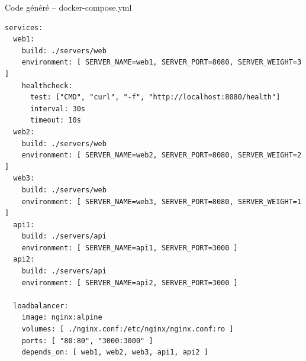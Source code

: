 \documentclass[aspectratio=169,12pt]{beamer}
\begin{document}
\begin{frame}[fragile]{Code généré -- docker-compose.yml}
\begin{lstlisting}[language={},morekeywords={services,build,container_name,environment,healthcheck,test,interval,timeout,ports,depends_on,image,volumes,networks}]
services:
  web1:
    build: ./servers/web
    environment: [ SERVER_NAME=web1, SERVER_PORT=8080, SERVER_WEIGHT=3 ]
    healthcheck:
      test: ["CMD", "curl", "-f", "http://localhost:8080/health"]
      interval: 30s
      timeout: 10s
  web2:
    build: ./servers/web
    environment: [ SERVER_NAME=web2, SERVER_PORT=8080, SERVER_WEIGHT=2 ]
  web3:
    build: ./servers/web
    environment: [ SERVER_NAME=web3, SERVER_PORT=8080, SERVER_WEIGHT=1 ]
  api1:
    build: ./servers/api
    environment: [ SERVER_NAME=api1, SERVER_PORT=3000 ]
  api2:
    build: ./servers/api
    environment: [ SERVER_NAME=api2, SERVER_PORT=3000 ]

  loadbalancer:
    image: nginx:alpine
    volumes: [ ./nginx.conf:/etc/nginx/nginx.conf:ro ]
    ports: [ "80:80", "3000:3000" ]
    depends_on: [ web1, web2, web3, api1, api2 ]
\end{lstlisting}
\end{frame}
\end{document}

